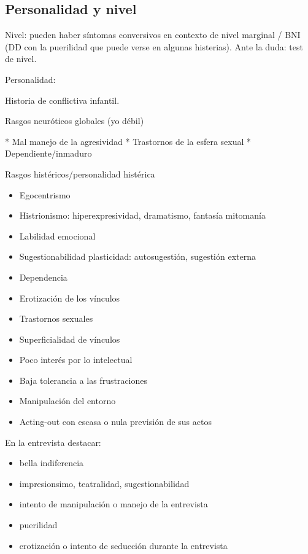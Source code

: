 \documentclass{scrbook}
\begin{document}
\subsection*{Personalidad y nivel}
Nivel: pueden haber síntomas conversivos en contexto de nivel marginal / BNI (DD con la puerilidad que puede verse en algunas histerias). Ante la duda: test de nivel.

Personalidad:

Historia de conflictiva infantil.

Rasgos neuróticos globales (yo débil)

* Mal manejo de la agresividad
* Trastornos de la esfera sexual
* Dependiente/inmaduro

Rasgos histéricos/personalidad histérica
\begin{itemize}
	\item Egocentrismo
	\item Histrionismo: hiperexpresividad, dramatismo, fantasía mitomanía
	\item Labilidad emocional
	\item Sugestionabilidad plasticidad: autosugestión, sugestión externa
	\item Dependencia
	\item Erotización de los vínculos
	\item Trastornos sexuales
	\item Superficialidad de vínculos
	\item Poco interés por lo intelectual
	\item Baja tolerancia a las frustraciones
	\item Manipulación del entorno
	\item Acting-out con escasa o nula previsión de sus actos
\end{itemize}

En la entrevista destacar:
\begin{itemize}
	\item bella indiferencia
	\item impresionsimo, teatralidad, sugestionabilidad
	\item intento de manipulación o manejo de la entrevista
	\item puerilidad
	\item erotización o intento de seducción durante la entrevista
\end{itemize}
\end{document}
